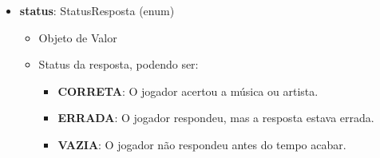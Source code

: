 \begin{itemize}
        \item \textbf{status}: StatusResposta (enum)  
              \begin{itemize}
                  \item Objeto de Valor
                  \item Status da resposta, podendo ser:
                  \begin{itemize}
                      \item \textbf{CORRETA}: O jogador acertou a música ou artista.
                      \item \textbf{ERRADA}: O jogador respondeu, mas a resposta estava errada.
                      \item \textbf{VAZIA}: O jogador não respondeu antes do tempo acabar.
                  \end{itemize}
              \end{itemize}
    \end{itemize}
